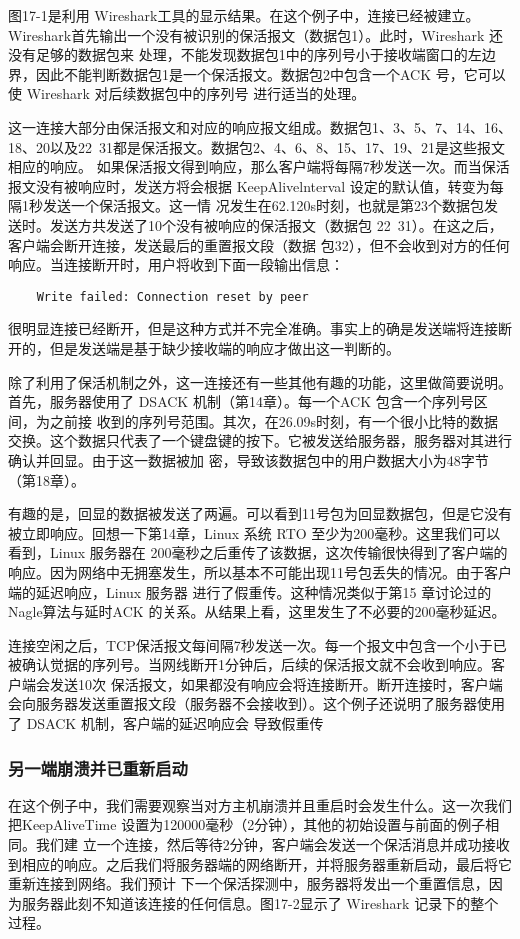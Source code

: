 图17-1是利用 Wireshark工具的显示结果。在这个例子中，连接已经被建立。Wireshark首先输出一个没有被识别的保活报文（数据包1）。此时，Wireshark 还没有足够的数据包来
处理，不能发现数据包1中的序列号小于接收端窗口的左边界，因此不能判断数据包1是一个保活报文。数据包2中包含一个ACK 号，它可以使 Wireshark 对后续数据包中的序列号
进行适当的处理。

这一连接大部分由保活报文和对应的响应报文组成。数据包1、3、5、7、14、16、18、20以及22~31都是保活报文。数据包2、4、6、8、15、17、19、21是这些报文相应的响应。
如果保活报文得到响应，那么客户端将每隔7秒发送一次。而当保活报文没有被响应时，发送方将会根据 KeepAlivelnterval 设定的默认值，转变为每隔1秒发送一个保活报文。这一情
况发生在62.120s时刻，也就是第23个数据包发送时。发送方共发送了10个没有被响应的保活报文（数据包 22~31）。在这之后，客户端会断开连接，发送最后的重置报文段（数据
包32），但不会收到对方的任何响应。当连接断开时，用户将收到下面一段输出信息：
\begin{verbatim}
    Write failed: Connection reset by peer
\end{verbatim}
很明显连接已经断开，但是这种方式并不完全准确。事实上的确是发送端将连接断开的，但是发送端是基于缺少接收端的响应才做出这一判断的。

除了利用了保活机制之外，这一连接还有一些其他有趣的功能，这里做简要说明。首先，服务器使用了 DSACK 机制（第14章）。每一个ACK 包含一个序列号区间，为之前接
收到的序列号范围。其次，在26.09s时刻，有一个很小比特的数据交换。这个数据只代表了一个键盘键的按下。它被发送给服务器，服务器对其进行确认并回显。由于这一数据被加
密，导致该数据包中的用户数据大小为48字节（第18章）。

有趣的是，回显的数据被发送了两遍。可以看到11号包为回显数据包，但是它没有被立即响应。回想一下第14章，Linux 系统 RTO 至少为200毫秒。这里我们可以看到，Linux
服务器在 200毫秒之后重传了该数据，这次传输很快得到了客户端的响应。因为网络中无拥塞发生，所以基本不可能出现11号包丢失的情况。由于客户端的延迟响应，Linux 服务器
进行了假重传。这种情况类似于第15 章讨论过的Nagle算法与延时ACK 的关系。从结果上看，这里发生了不必要的200毫秒延迟。

连接空闲之后，TCP保活报文每间隔7秒发送一次。每一个报文中包含一个小于已被确认觉据的序列号。当网线断开1分钟后，后续的保活报文就不会收到响应。客户端会发送10次
保活报文，如果都没有响应会将连接断开。断开连接时，客户端会向服务器发送重置报文段（服务器不会接收到）。这个例子还说明了服务器使用了 DSACK 机制，客户端的延迟响应会
导致假重传

\subsubsection{另一端崩溃并已重新启动}
在这个例子中，我们需要观察当对方主机崩溃并且重启时会发生什么。这一次我们把KeepAliveTime 设置为120000毫秒（2分钟），其他的初始设置与前面的例子相同。我们建
立一个连接，然后等待2分钟，客户端会发送一个保活消息并成功接收到相应的响应。之后我们将服务器端的网络断开，并将服务器重新启动，最后将它重新连接到网络。我们预计
下一个保活探测中，服务器将发出一个重置信息，因为服务器此刻不知道该连接的任何信息。图17-2显示了 Wireshark 记录下的整个过程。

